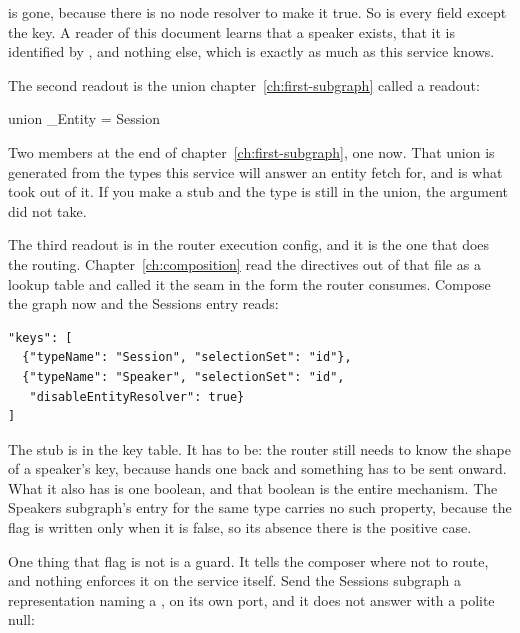 %
 is gone, because there is no node resolver to make it
true. So is every field except the key. A reader of this document learns that
a speaker exists, that it is identified by , and nothing else, which
is exactly as much as this service knows.

%
The second readout is the union chapter~\ref{ch:first-subgraph} called a
readout:

\begin{graphqlsdl}
union _Entity = Session
\end{graphqlsdl}

%
Two members at the end of chapter~\ref{ch:first-subgraph}, one now. That union
is generated from the types this service will answer an entity fetch for, and
 is what took  out of it. If you make a
stub and the type is still in the union, the argument did not take.

%
The third readout is in the router execution config, and it is the one that
does the routing. Chapter~\ref{ch:composition} read the  directives
out of that file as a lookup table and called it the seam in the form the
router consumes. Compose the graph now and the Sessions entry reads:

\begin{verbatim}
"keys": [
  {"typeName": "Session", "selectionSet": "id"},
  {"typeName": "Speaker", "selectionSet": "id",
   "disableEntityResolver": true}
]
\end{verbatim}

%
The stub is in the key table. It has to be: the router still needs to know the
shape of a speaker's key, because  hands one back and
something has to be sent onward. What it also has is one boolean, and that
boolean is the entire mechanism. The Speakers subgraph's entry for the same
type carries no such property, because the flag is written only when it is
false, so its absence there is the positive case.

%
One thing that flag is not is a guard. It tells the composer where not to
route, and nothing enforces it on the service itself. Send the Sessions
subgraph a representation naming a , on its own port, and it
does not answer with a polite null:

